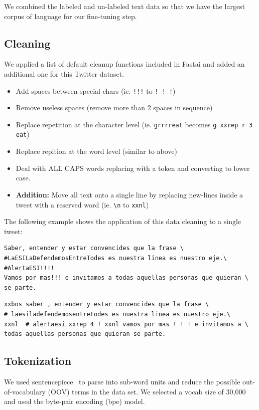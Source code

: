 \documentclass[smallcondensed]{svjour3}     %
\begin{document}
We combined the labeled and un-labeled text data so that we have the largest corpus of language for our fine-tuning step. 
\subsection{Cleaning}
We applied a list of default cleanup functions included in Fastai and added an additional one for this Twitter dataset.
\begin{itemize}
	\item Add spaces between special chars (ie. \verb|!!!| to \verb|! ! !|)
	\item Remove useless spaces (remove more than 2 spaces in sequence)
	\item Replace repetition at the character level (ie. \verb|grrrreat| becomes \verb|g xxrep r 3 eat|)
	\item Replace repition at the word level (similar to above)
	\item Deal with ALL CAPS words replacing with a token and converting to lower case.
	\item \textbf{Addition:} Move all text onto a single line by replacing new-lines inside a tweet with a reserved word (ie. \verb|\n| to \verb|xxnl|)
\end{itemize} 
\pagebreak  %
The following example shows the application of this data cleaning to a single tweet:
\begin{verbatim} 
Saber, entender y estar convencides que la frase \
#LaESILaDefendemosEntreTodes es nuestra linea es nuestro eje.\
#AlertaESI!!!!
Vamos por mas!!! e invitamos a todas aquellas personas que quieran \
se parte.
\end{verbatim}

\begin{verbatim} 
xxbos saber , entender y estar convencides que la frase \
# laesiladefendemosentretodes es nuestra linea es nuestro eje.\
xxnl  # alertaesi xxrep 4 ! xxnl vamos por mas ! ! ! e invitamos a \
todas aquellas personas que quieran se parte.
\end{verbatim}

\subsection{Tokenization}
We used sentencepiece~\cite{SentencePiece:DBLP:journals/corr/abs-1808-06226} to parse into sub-word units and reduce the possible out-of-vocabulary (OOV) terms in the data set.  We selected a vocab size of 30,000 and used the byte-pair encoding (bpe) model. 
\end{document}
